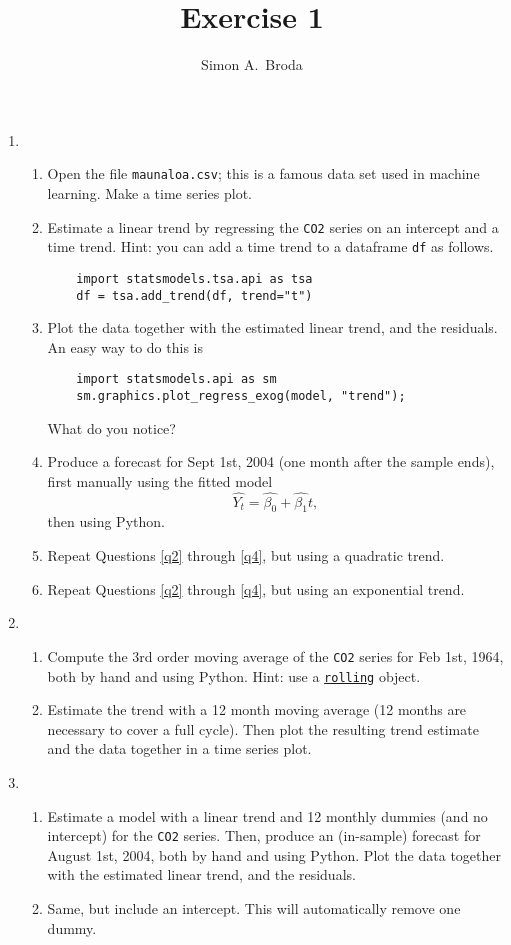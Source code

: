 \documentclass[11pt, a4paper]{article}
\begin{document}
\title{Exercise 1}
\author{Simon A.\ Broda}
\date{}
\maketitle

\begin{enumerate}
\item
\begin{enumerate}
\item \label{q1} Open the file \texttt{maunaloa.csv}; this is a famous data set used in machine learning. Make a time series plot.
\item \label{q2} Estimate a linear trend by regressing the \texttt{CO2} series on an intercept and a time trend. Hint: you can add a time trend to a dataframe \verb+df+ as follows.
\begin{verbatim}
	import statsmodels.tsa.api as tsa
	df = tsa.add_trend(df, trend="t")
\end{verbatim}
\item \label{q3} Plot the data together with the estimated linear trend, and the residuals. An easy way to do this is
\begin{verbatim}
	import statsmodels.api as sm
	sm.graphics.plot_regress_exog(model, "trend");
\end{verbatim}
What do you notice?
\item \label{q4} Produce a forecast for Sept 1st, 2004 (one month after the sample ends), first manually using the fitted model
\[
\widehat{Y_t} = \widehat{\beta_0}+\widehat{\beta_1} t,
\]
then using Python.
\item Repeat Questions \ref{q2} through \ref{q4}, but using a quadratic trend.
\item Repeat Questions \ref{q2} through \ref{q4}, but using an exponential trend.
\end{enumerate}
\item
\begin{enumerate}
\item Compute the 3rd order moving average of the \texttt{CO2} series for Feb 1st, 1964, both by hand and using Python. Hint: use a \href{https://pandas.pydata.org/docs/reference/api/pandas.DataFrame.rolling.html}{\texttt{rolling}} object.
\item Estimate the trend with a 12 month moving average (12 months are necessary to cover a full cycle). Then plot the resulting trend estimate and the data together in a time series plot.
\end{enumerate}
\item
\begin{enumerate}
\item Estimate a model with a linear trend and 12 monthly dummies (and no intercept) for the \texttt{CO2} series. Then, produce an (in-sample) forecast for August 1st, 2004, both by hand and using Python. Plot the data together with the estimated linear trend, and the residuals.
\item Same, but include an intercept. This will automatically remove one dummy.
\end{enumerate}
\end{enumerate}
\end{document}
